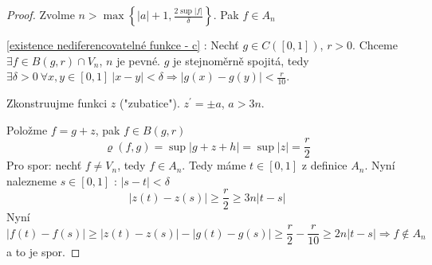 \begin{proof}
Zvolme $n > \max \left\{ |a|+1, \frac{2 \sup |f|}{\delta} \right\}$. Pak $f \in A_n$

\ref{existence nediferencovatelné funkce - c} : Nechť $g \in C([0,1])$, $r > 0$. Chceme $\exists f \in B(g,r) \cap V_n$, $n$ je pevné. $g$ je stejnoměrně spojitá, tedy $\exists \delta > 0 \ \forall x,y \in [0,1] \ |x-y| < \delta \Rightarrow |g(x)-g(y)| < \frac{r}{10}$.

Zkonstruujme funkci $z$ ("zubatice"). $z^\prime = \pm a$, $a > 3n$.

Položme $f = g + z$, pak $f \in B(g,r)$
$$\varrho (f,g) = \sup |g + z + h| = \sup |z| = \frac{r}{2}$$
Pro spor: nechť $f \neq V_n$, tedy $f \in A_n$. Tedy máme $t \in [0,1]$ z definice $A_n$. Nyní nalezneme $s \in [0,1] \textrm{ : } |s-t| < \delta$
$$|z(t)-z(s)| \geq \frac{r}{2} \geq 3 n |t-s|$$
Nyní
$$|f(t)-f(s)| \geq |z(t)-z(s)|-|g(t)-g(s)| \geq \frac{r}{2} - \frac{r}{10} \geq 2 n |t-s| \Rightarrow f \notin A_n$$
a to je spor.
\end{proof}




